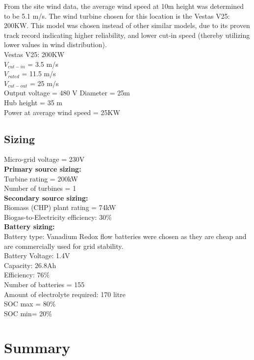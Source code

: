 From the site wind data, the average wind speed at 10m height was determined to be 5.1 m/s. The wind turbine chosen for this location is the Vestas V25: 200KW. This model was chosen instead of other similar models, due to its proven track record indicating higher reliability, and lower cut-in speed (thereby utilizing lower values in wind distribution).\\ 
Vestas V25: 200KW\\
$V_{cut-in}$ = 3.5 m/s\\
$V_{rated}$ = 11.5 m/s\\
$V_{cut-out}$ = 25 m/s\\
Output voltage = 480 V
Diameter = 25m\\
Hub height = 35 m\\
Power at average wind speed = 25KW




\subsection{Sizing}

Micro-grid voltage = 230V \\
\textbf{Primary source sizing:}\\
Turbine rating = 200kW\\
Number of turbines = 1\\
\textbf{Secondary source sizing:}\\
Biomass (CHP) plant rating = 74kW \\
Biogas-to-Electricity efficiency: 30$\%$ \\
\textbf{Battery sizing:}\\
Battery type: Vanadium Redox flow batteries were chosen as they are cheap and are commercially used for grid stability. \\
Battery Voltage: 1.4V\\
Capacity: 26.8Ah\\
Efficiency: 76$\%$ \\
Number of batteries = 155\\
Amount of electrolyte required: 170 litre\\
SOC max = 80$\%$\\
SOC min= 20$\%$


\section{Summary}

